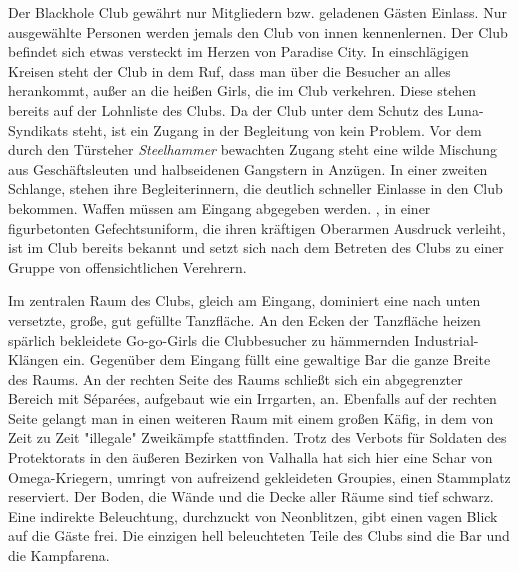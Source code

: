 
Der Blackhole Club gewährt nur Mitgliedern bzw. geladenen Gästen Einlass. Nur ausgewählte Personen werden jemals den Club von innen kennenlernen. Der Club befindet sich etwas versteckt im Herzen von Paradise City. In einschlägigen Kreisen steht der Club in dem Ruf, dass man über die Besucher an alles herankommt, außer an die heißen Girls, die im Club verkehren. Diese stehen bereits auf der Lohnliste des Clubs. Da der Club unter dem Schutz des Luna-Syndikats steht, ist ein Zugang in der Begleitung von \xl{} kein Problem. Vor dem durch den Türsteher \emph{Steelhammer} bewachten Zugang steht eine wilde Mischung aus Geschäftsleuten und halbseidenen Gangstern in Anzügen. In einer zweiten Schlange, stehen ihre Begleiterinnern, die deutlich schneller Einlasse in den Club bekommen. Waffen müssen am Eingang abgegeben werden. \xl{}, in einer figurbetonten Gefechtsuniform, die ihren kräftigen Oberarmen Ausdruck verleiht, ist im Club bereits bekannt und setzt sich nach dem Betreten des Clubs zu einer Gruppe von offensichtlichen Verehrern.

Im zentralen Raum des Clubs, gleich am Eingang, dominiert eine nach unten versetzte, große, gut gefüllte Tanzfläche. An den Ecken der Tanzfläche heizen spärlich bekleidete Go-go-Girls die Clubbesucher zu hämmernden Industrial-Klängen ein. Gegenüber dem Eingang füllt eine gewaltige Bar die ganze Breite des Raums. An der rechten Seite des Raums schließt sich ein abgegrenzter Bereich mit Séparées, aufgebaut wie ein Irrgarten, an. Ebenfalls auf der rechten Seite gelangt man in einen weiteren Raum mit einem großen Käfig, in dem von Zeit zu Zeit "illegale" Zweikämpfe stattfinden. Trotz des Verbots für Soldaten des Protektorats in den äußeren Bezirken von Valhalla hat sich hier eine Schar von Omega-Kriegern, umringt von aufreizend gekleideten Groupies, einen Stammplatz reserviert. Der Boden, die Wände und die Decke aller Räume sind tief schwarz. Eine indirekte Beleuchtung, durchzuckt von Neonblitzen, gibt einen vagen Blick auf die Gäste frei. Die einzigen hell beleuchteten Teile des Clubs sind die Bar und die Kampfarena.



